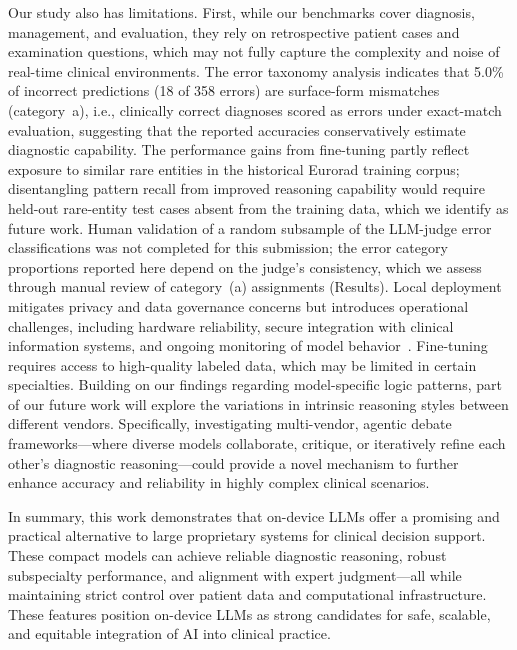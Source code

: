 \documentclass[10pt,journal,compsoc, onecolumn]{IEEEtran}
\begin{document}
Our study also has limitations. First, while our benchmarks cover diagnosis, management, and evaluation, they rely on retrospective patient cases and examination questions, which may not fully capture the complexity and noise of real-time clinical environments. The error taxonomy analysis indicates that 5.0\% of incorrect predictions (18 of 358 errors) are surface-form mismatches (category~a), i.e., clinically correct diagnoses scored as errors under exact-match evaluation, suggesting that the reported accuracies conservatively estimate diagnostic capability. The performance gains from fine-tuning partly reflect exposure to similar rare entities in the historical Eurorad training corpus; disentangling pattern recall from improved reasoning capability would require held-out rare-entity test cases absent from the training data, which we identify as future work. Human validation of a random subsample of the LLM-judge error classifications was not completed for this submission; the error category proportions reported here depend on the judge's consistency, which we assess through manual review of category~(a) assignments (Results). Local deployment mitigates privacy and data governance concerns but introduces operational challenges, including hardware reliability, secure integration with clinical information systems, and ongoing monitoring of model behavior~\cite{asgari2025hallucination, omar2025adversarial}. Fine-tuning requires access to high-quality labeled data, which may be limited in certain specialties. Building on our findings regarding model-specific logic patterns, part of our future work will explore the variations in intrinsic reasoning styles between different vendors. Specifically, investigating multi-vendor, agentic debate frameworks—where diverse models collaborate, critique, or iteratively refine each other's diagnostic reasoning—could provide a novel mechanism to further enhance accuracy and reliability in highly complex clinical scenarios.

In summary, this work demonstrates that on-device LLMs offer a promising and practical alternative to large proprietary systems for clinical decision support. These compact models can achieve reliable diagnostic reasoning, robust subspecialty performance, and alignment with expert judgment---all while maintaining strict control over patient data and computational infrastructure. These features position on-device LLMs as strong candidates for safe, scalable, and equitable integration of AI into clinical practice.
\end{document}
